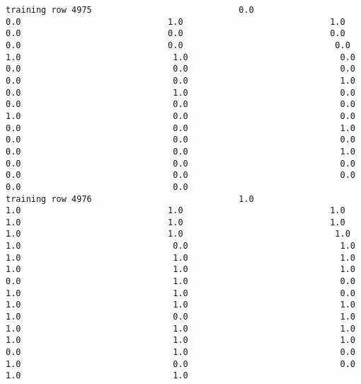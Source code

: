 \documentclass[11pt]{article}
\begin{document}
\begin{verbatim}
training row 4975                             0.0                             0.0                             1.0                             1.0                             0.0                             0.0                             0.0                             0.0                             0.0                              0.0                              1.0                              1.0                              0.0                              0.0                              0.0                              0.0                              0.0                              0.0                              1.0                              0.0                              1.0                              0.0                              0.0                              0.0                              0.0                              1.0                              0.0                              0.0                              0.0                              0.0                              1.0                              0.0                              0.0                              0.0                              0.0                              0.0                              1.0                              0.0                              0.0                              0.0                              0.0                              0.0                              0.0                              0.0                              0.0
training row 4976                             1.0                             1.0                             1.0                             1.0                             1.0                             1.0                             1.0                             1.0                             1.0                              1.0                              1.0                              0.0                              1.0                              1.0                              1.0                              1.0                              1.0                              1.0                              1.0                              0.0                              1.0                              0.0                              1.0                              1.0                              0.0                              1.0                              1.0                              1.0                              1.0                              0.0                              1.0                              1.0                              1.0                              1.0                              1.0                              1.0                              1.0                              0.0                              1.0                              0.0                              1.0                              0.0                              0.0                              1.0                              1.0

\end{verbatim}
\end{document}
